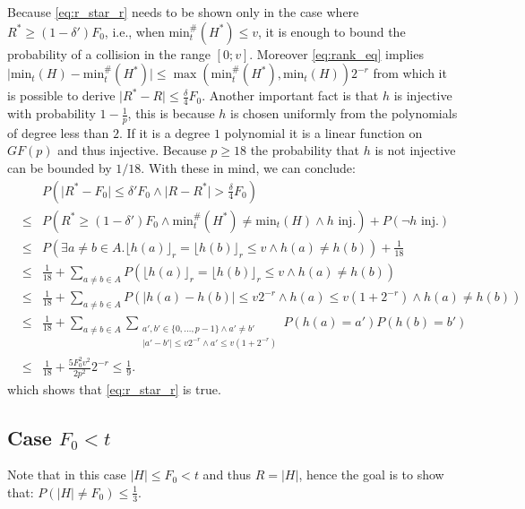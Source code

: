 \documentclass[11pt,a4paper]{article}
\newcommand{\size}[1]{\lvert#1\rvert}
\begin{document}
Because \autoref{eq:r_star_r} needs to be shown only in the case where $R^* \geq (1-\delta') F_0$, i.e., when $\mathrm{min}_t^{\#}(H^*) \leq v$,
it is enough to bound the probability of a collision in the range $[0; v]$.
Moreover \autoref{eq:rank_eq} implies $\size{\mathrm{min}_t(H) - \mathrm{min}_t^{\#}(H^*)} \leq \max(\mathrm{min}_t^{\#}(H^*), \mathrm{min}_t(H)) 2^{-r}$ from
which it is possible to derive $\size{R^*-R} \leq \frac{\delta}{4} F_0$.
Another important fact is that $h$ is injective with probability $1-\frac{1}{p}$, this is because $h$ is chosen uniformly from the polynomials of degree less than $2$.
If it is a degree $1$ polynomial it is a linear function on $GF(p)$ and thus injective.
Because $p \geq 18$ the probability that $h$ is not injective can be bounded by $1/18$. With these in mind, we can conclude: 
\begin{eqnarray*}
    & & P\left( \size{R^*-F_0} \leq \delta' F_0 \wedge \size{R-R^*} > \frac{\delta}{4} F_0 \right) \\
    & \leq & P\left( R^* \geq (1-\delta') F_0 \wedge \mathrm{min}_t^{\#}(H^*) \neq \mathrm{min}_t(H) \wedge h \textrm{ inj.}\right) + P(\neg h \textrm{ inj.}) \\
    & \leq & P\left( \exists a \neq b \in A. \lfloor h(a) \rfloor_r = \lfloor h(b) \rfloor_r \leq v \wedge h(a) \neq h(b) \right) + \frac{1}{18} \\
    & \leq & \frac{1}{18} + \sum_{a \neq b \in A} P\left(\lfloor h(a) \rfloor_r = \lfloor h(b) \rfloor_r \leq v \wedge h(a) \neq h(b) \right) \\
    & \leq & \frac{1}{18} + \sum_{a \neq b \in A} P\left(\size{h(a) - h(b)} \leq v 2^{-r} \wedge h(a) \leq v (1+2^{-r}) \wedge h(a) \neq h(b) \right) \\
    & \leq & \frac{1}{18} + \sum_{a \neq b \in A} \sum_{\substack{a', b' \in \{0,\ldots, p-1\} \wedge a' \neq b' \\ \size{a'-b'} \leq v 2^{-r} \wedge a' \leq v (1+2^{-r})}} P(h(a) = a') P(h(b)= b') \\
    & \leq & \frac{1}{18} + \frac{5 F_0^2 v^2}{2 p^2} 2^{-r} \leq \frac{1}{9} \textrm{.}
\end{eqnarray*}
which shows that \autoref{eq:r_star_r} is true.\subsection{Case $F_0 < t$}
Note that in this case $\size{H} \leq F_0 < t$ and thus $R = \size{H}$, hence the goal is to show that:
$P(\size{H} \neq F_0) \leq \frac{1}{3}$.
\end{document}
